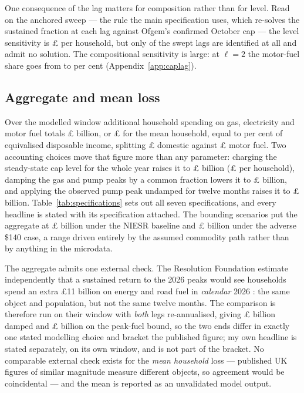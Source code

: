 One consequence of the lag matters for composition rather than for level. Read on the anchored sweep --- the rule the main specification uses, which re-solves the sustained fraction at each lag against Ofgem's confirmed October cap --- the level sensitivity is \pounds \genCapLagRangeGbp{} per household, but only \genCapLagAnchoredIdentifiedCount{} of the swept lags are identified at all and \genCapLagAnchoredNonIdentifiedCount{} admit no solution. The compositional sensitivity is large: at $\ell = 2$ the motor-fuel share goes from \genMotorFuelShareOfLoss{} to \genCapLagMotorFuelShareLagTwoAnchoredPct{} per cent (Appendix~\ref{app:caplag}).

\subsection{Aggregate and mean loss}
\label{sec:results-aggregate}

Over the modelled window additional household spending on gas, electricity and motor fuel totals \pounds \genAggSpendRealisedBn{} billion, or \pounds \genCentralLossMean{} for the mean household, equal to \genCentralLossPctIncome{} per cent of equivalised disposable income, splitting \pounds \genDomesticMeanLossGbp{} domestic against \pounds \genMotorFuelMeanLossGbp{} motor fuel. Two accounting choices move that figure more than any parameter: charging the steady-state cap level for the whole year raises it to \pounds \genSteadyStateAggBn{} billion (\pounds \genSteadyStateLossMean{} per household), damping the gas and pump peaks by a common fraction lowers it to \pounds \genSymDampAggBn{} billion, and applying the observed pump peak undamped for twelve months raises it to \pounds \genPeakFuelAggBn{} billion. Table~\ref{tab:specifications} sets out all seven specifications, and every headline is stated with its specification attached. The bounding scenarios put the aggregate at \pounds \genAggSpendBaselineBn{} billion under the NIESR baseline and \pounds \genAggSpendAdverseBn{} billion under the adverse \$140 case, a range driven entirely by the assumed commodity path rather than by anything in the microdata.

The aggregate admits one external check. The Resolution Foundation estimate independently that a sustained return to the 2026 peaks would see households spend an extra \pounds 11 billion on energy and road fuel in \emph{calendar} 2026 \citep{rf2026outlook}: the same object and population, but not the same twelve months. The comparison is therefore run on their window with \emph{both} legs re-annualised, giving \pounds \genCalendarAggBn{} billion damped and \pounds \genPeakFuelCalendarAggBn{} billion on the peak-fuel bound, so the two ends differ in exactly one stated modelling choice and bracket the published figure; my own headline is stated separately, on its own window, and is not part of the bracket. No comparable external check exists for the \emph{mean household} loss --- published UK figures of similar magnitude measure different objects, so agreement would be coincidental --- and the mean is reported as an unvalidated model output.

